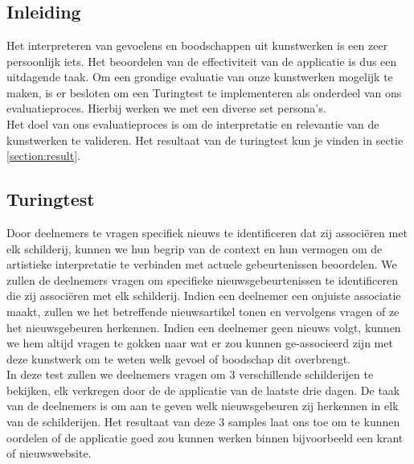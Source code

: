 \chapter{}%
\label{ch:evaluatieproces}
\section{Inleiding}
Het interpreteren van gevoelens en boodschappen uit kunstwerken is een zeer persoonlijk iets. Het beoordelen van de effectiviteit van de applicatie is dus een uitdagende taak. Om een grondige evaluatie van onze kunstwerken mogelijk te maken, is er besloten om een Turingtest te implementeren als onderdeel van ons evaluatieproces. Hierbij werken we met een diverse set persona's. \\

Het doel van ons evaluatieproces is om de interpretatie en relevantie van de kunstwerken te valideren. Het resultaat van de turingtest kun je vinden in sectie \ref{section:result}.

\section{Turingtest}
\label{sec:turingtest}
 Door deelnemers te vragen specifiek nieuws te identificeren dat zij associëren met elk schilderij, kunnen we hun begrip van de context en hun vermogen om de artistieke interpretatie te verbinden met actuele gebeurtenissen beoordelen. We zullen de deelnemers vragen om specifieke nieuwsgebeurtenissen te identificeren die zij associëren met elk schilderij.  Indien een deelnemer een onjuiste associatie maakt, zullen we het betreffende nieuwsartikel tonen en vervolgens vragen of ze het nieuwsgebeuren herkennen. Indien een deelnemer geen nieuws volgt, kunnen we hem altijd vragen te gokken naar wat er zou kunnen ge-associeerd zijn met deze kunstwerk om te weten welk gevoel of boodschap dit overbrengt. \\
 
 In deze test zullen we deelnemers vragen om 3 verschillende schilderijen te bekijken, elk verkregen door de de applicatie van de laatste drie dagen. De taak van de deelnemers is om aan te geven welk nieuwsgebeuren zij herkennen in elk van de schilderijen. Het resultaat van deze 3 samples laat ons toe om te kunnen oordelen of de applicatie goed zou kunnen werken binnen bijvoorbeeld een krant of nieuwswebsite.  \\
 
